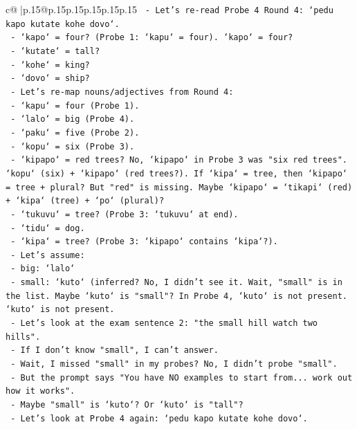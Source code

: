 \documentclass{article}
\begin{document}
{\begin{supertabular}{c@{$\;$}|p{.15\linewidth}@{}p{.15\linewidth}p{.15\linewidth}p{.15\linewidth}p{.15\linewidth}p{.15\linewidth}}
{{{\texttt{    {-} Let's re{-}read Probe 4 Round 4: `pedu kapo kutate kohe dovo`.} \\
\texttt{        {-} `kapo` = four? (Probe 1: `kapu` = four). `kapo` = four?} \\
\texttt{        {-} `kutate` = tall?} \\
\texttt{        {-} `kohe` = king?} \\
\texttt{        {-} `dovo` = ship?} \\
\texttt{    {-} Let's re{-}map nouns/adjectives from Round 4:} \\
\texttt{        {-} `kapu` = four (Probe 1).} \\
\texttt{        {-} `lalo` = big (Probe 4).} \\
\texttt{        {-} `paku` = five (Probe 2).} \\
\texttt{        {-} `kopu` = six (Probe 3).} \\
\texttt{        {-} `kipapo` = red trees? No, `kipapo` in Probe 3 was "six red trees". `kopu` (six) + `kipapo` (red trees?). If `kipa` = tree, then `kipapo` = tree + plural? But "red" is missing. Maybe `kipapo` = `tikapi` (red) + `kipa` (tree) + `po` (plural)?} \\
\texttt{        {-} `tukuvu` = tree? (Probe 3: `tukuvu` at end).} \\
\texttt{        {-} `tidu` = dog.} \\
\texttt{        {-} `kipa` = tree? (Probe 3: `kipapo` contains `kipa`?).} \\
\texttt{        {-} Let's assume:} \\
\texttt{            {-} big: `lalo`} \\
\texttt{            {-} small: `kuto` (inferred? No, I didn't see it. Wait, "small" is in the list. Maybe `kuto` is "small"? In Probe 4, `kuto` is not present. `kuto` is not present.} \\
\texttt{            {-} Let's look at the exam sentence 2: "the small hill watch two hills".} \\
\texttt{            {-} If I don't know "small", I can't answer.} \\
\texttt{            {-} Wait, I missed "small" in my probes? No, I didn't probe "small".} \\
\texttt{            {-} But the prompt says "You have NO examples to start from... work out how it works".} \\
\texttt{            {-} Maybe "small" is `kuto`? Or `kuto` is "tall"?} \\
\texttt{            {-} Let's look at Probe 4 again: `pedu kapo kutate kohe dovo`.} \\
}}}
\end{supertabular}}
\end{document}
